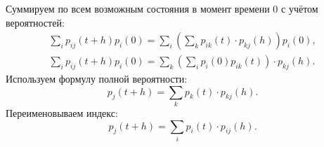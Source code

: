 \documentclass[12pt]{article}
\begin{document}
    Суммируем по всем возможным состояния в момент времени 0 с учётом вероятностей:
    \begin{gather*}
        \sum_i p_{ij}(t+h) p_i(0) = \sum_i \left ( \sum_k p_{ik}(t) \cdot p_{kj}(h) \right ) p_i(0) , \\
        \sum_i p_{ij}(t+h) p_i(0) = \sum_k \left ( \sum_i p_i(0) p_{ik}(t) \right ) \cdot p_{kj}(h).
    \end{gather*}
    Используем формулу полной вероятности:
    \[
        p_j(t+h) = \sum_k p_k(t) \cdot p_{kj}(h) .
    \]
    Переименовываем индекс:
    \[
        p_j(t+h) = \sum_i p_i(t) \cdot p_{ij}(h) .
    \]
\end{document}
